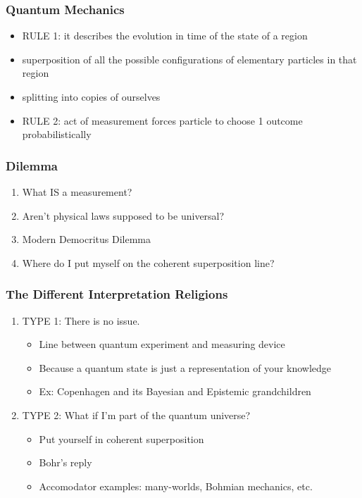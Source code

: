 \documentclass{beamer}
\begin{document}
\begin{frame}
\frametitle{Quantum Mechanics}


\begin{itemize}

 \item RULE 1: it describes the evolution in time of the state of a region
 \item \alert{superposition} of all the possible configurations
of elementary particles in that region
 \item splitting into copies of ourselves
 \item RULE 2: act of measurement forces particle to choose 1 outcome probabilistically
\end{itemize}

\end{frame}

\begin{frame}
\frametitle{Dilemma}

\begin{enumerate}
 \item What IS a measurement?
\item Aren't physical laws supposed to be universal?
\item Modern Democritus Dilemma
\item Where do I put myself on the \alert{coherent superposition line}?
\end{enumerate}
\end{frame}
\begin{frame}
\frametitle{The Different Interpretation Religions}

\begin{enumerate}
    \item<1-> TYPE 1: There is no issue.
    \begin{itemize}
        \item Line between quantum experiment and measuring device
        \item Because a quantum state is just a representation of your knowledge
        \item Ex: Copenhagen and its Bayesian and Epistemic grandchildren
    \end{itemize}

    \item<2-> TYPE 2: What if I'm part of the quantum universe?
    \begin{itemize}
        \item Put yourself in coherent superposition
        \item Bohr's reply
        \item Accomodator examples: many-worlds, Bohmian mechanics, etc.
    \end{itemize}
    
\end{enumerate}

\end{frame}
\end{document}
